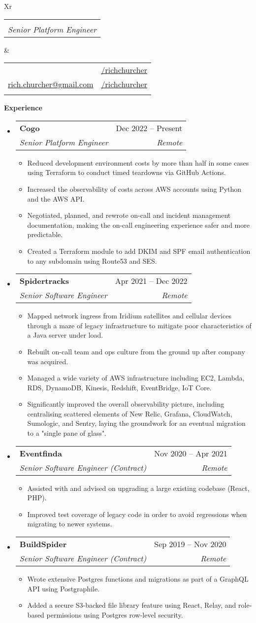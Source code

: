\documentclass[12pt]{article}
\makeatletter
\def \fullname {Rich Churcher}
\def \subtitle {Senior Platform Engineer}
\def \linkedinicon {\faLinkedin}
\def \linkedinlink {https://linkedin.com/in/dwight-schrute/}
\def \linkedintext {/richchurcher}
\def \phoneicon {\faPhone}
\def \phonetext {+64-21-126-3919}
\def \emailicon {\faEnvelope}
\def \emaillink {mailto:rich.churcher@gmail.com}
\def \emailtext {rich.churcher@gmail.com}
\def \githubicon {\faGithub}
\def \githublink {https://github.com/richchurcher}
\def \githubtext {/richchurcher}
\def \headertype {\doublecol} %
\def \entryspacing {-0em}
\def \linkedin {\linkedinicon \hspace{1em}\href{\linkedinlink}{\linkedintext}}
\def \phone {\phoneicon \hspace{1em}{\phonetext}}
\def \email {\emailicon \hspace{1em}\href{\emaillink}{\emailtext}}
\def \github {\githubicon \hspace{1em}\href{\githublink}{\githubtext}}
\renewcommand{\section}[2]{\vspace{0.5ex}
  \colorbox{secondary}{\color{white}\raggedbottom\normalsize\textbf{{#1}{\hspace{0.5em}#2}}}
}
\newcommand{\resumeEntryStart}{\begin{itemize}[leftmargin=2.5mm]}
\newcommand{\resumeEntryEnd}{\end{itemize}\vspace{\entryspacing}}
\newcommand{\resumeItemListStart}{\begin{itemize}[leftmargin=4.5mm]}
\newcommand{\resumeItemListEnd}{\end{itemize}}
\newcommand{\resumeItem}[1]{
  \item\small{
    {#1 \vspace{-0.9ex}}
  }
}
\newcommand{\resumeEntryTSDL}[4]{
  \vspace{-0.5ex}\item[]
    \begin{tabularx}{0.97\textwidth}{X@{\hspace{5em}}r}
      \textbf{\color{primary}#1} & {\firabook\color{accent}\small#2} \\
      \textit{\color{accent}\small#3} & \textit{\color{accent}\small#4} \\
    \end{tabularx}\vspace{-0.9ex}
}
\newcommand{\doublecol}[6]{
  \begin{tabularx}{\textwidth}{Xr}
    {
      \begin{tabular}[c]{l}
        \fontsize{35}{45}\selectfont{\color{primary}{{\textbf{\fullname}}}} \\
          {\textit{\subtitle}}
      \end{tabular}\vspace{2ex}
    } & {
      \begin{tabular}[c]{l@{\hspace{1em}}l}
        {\small#4} & {\small#1} \\
        {\small#5} & {\small#2} \\
        {\small#6} & {\small#3}
      \end{tabular}
    }
  \end{tabularx}
}
\newcommand{\singlecol}[6]{
  \begin{tabularx}{\textwidth}{Xr}
    {
      \begin{tabular}[b]{l}
        \fontsize{35}{45}\selectfont{\color{primary}{{\textbf{\fullname}}}} \\
        {\textit{\subtitle}} %
      \end{tabular}
    } & {
      \begin{tabular}[c]{l}
        {\small#1} \\
        {\small#2} \\
        {\small#3} \\
        {\small#4} \\
        {\small#5} \\
        {\small#6}
      \end{tabular}
    }
  \end{tabularx}
}
\makeatother
\begin{document}
\headertype{\linkedin}{\github}{}{\phone}{\email}{}

\section{\faPieChart}{Experience}

  \resumeEntryStart
    \resumeEntryTSDL
      {Cogo}{Dec 2022 -- Present}
      {Senior Platform Engineer}{Remote}
    \resumeItemListStart
      \resumeItem {Reduced development environment costs by more than half in some cases using Terraform to conduct timed teardowns via GitHub Actions.}
      \resumeItem {Increased the observability of costs across AWS accounts using Python and the AWS API.}
      \resumeItem {Negotiated, planned, and rewrote on-call and incident management documentation, making the on-call engineering experience safer and more predictable.}
      \resumeItem {Created a Terraform module to add DKIM and SPF email authentication to any subdomain using Route53 and SES.}
    \resumeItemListEnd
  \resumeEntryEnd

  \resumeEntryStart
    \resumeEntryTSDL
      {Spidertracks}{Apr 2021 -- Dec 2022}
      {Senior Software Engineer}{Remote}
    \resumeItemListStart
      \resumeItem {Mapped network ingress from Iridium satellites and cellular devices through a maze of legacy infrastructure to mitigate poor characteristics of a Java server under load.}
      \resumeItem {Rebuilt on-call team and ops culture from the ground up after company was acquired.}
      \resumeItem {Managed a wide variety of AWS infrastructure including EC2, Lambda, RDS, DynamoDB, Kinesis, Redshift, EventBridge, IoT Core.}
      \resumeItem {Significantly improved the overall observability picture, including centralising scattered elements of New Relic, Grafana, CloudWatch, Sumologic, and Sentry, laying the groundwork for an eventual migration to a "single pane of glass".}
    \resumeItemListEnd
  \resumeEntryEnd

  \resumeEntryStart
    \resumeEntryTSDL
      {Eventfinda}{Nov 2020 -- Apr 2021}
      {Senior Software Engineer (Contract)}{Remote}
    \resumeItemListStart
        \resumeItem {Assisted with and advised on upgrading a large existing codebase (React, PHP).}
        \resumeItem {Improved test coverage of legacy code in order to avoid regressions when migrating to newer systems.}
    \resumeItemListEnd
  \resumeEntryEnd

  \resumeEntryStart
    \resumeEntryTSDL
      {BuildSpider}{Sep 2019 -- Nov 2020}
      {Senior Software Engineer (Contract)}{Remote}
    \resumeItemListStart
      \resumeItem {Wrote extensive Postgres functions and migrations as part of a GraphQL API using Postgraphile.}
      \resumeItem {Added a secure S3-backed file library feature using React, Relay, and role-based permissions using Postgres row-level security.}
    \resumeItemListEnd
  \resumeEntryEnd
\end{document}

